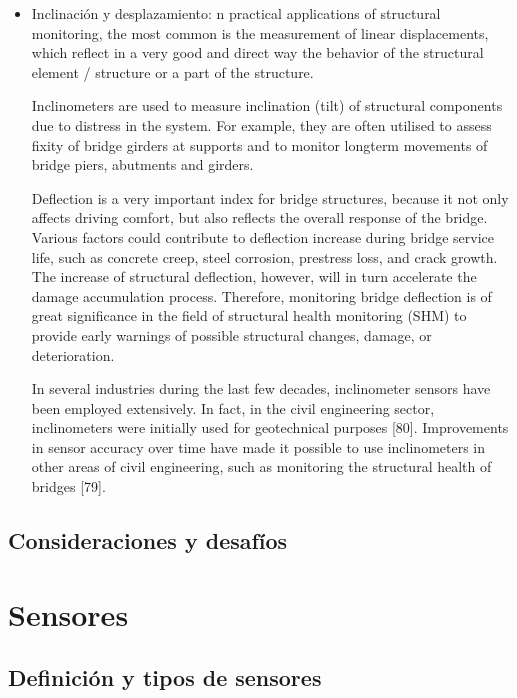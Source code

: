 \begin{itemize}
        \item Inclinación y desplazamiento: n practical applications of structural monitoring, the most common is the measurement of linear displacements, which reflect in a very good and direct way the behavior of the structural element / structure or a part of the structure.
        
        Inclinometers are used to measure inclination (tilt) of structural components due to distress in the system. For example, they are often utilised to assess fixity of bridge girders at supports and to monitor longterm movements of bridge piers, abutments and girders.

        Deflection is a very important index for bridge structures, because it not only affects driving comfort, but also reflects the overall response of the bridge. Various factors could contribute to deflection increase during bridge service life, such as concrete creep, steel corrosion, prestress loss, and crack growth. The increase of structural deflection, however, will in turn accelerate the damage accumulation process. Therefore, monitoring bridge deflection is of great significance in the field of structural health monitoring (SHM) to provide early warnings of possible structural changes, damage, or deterioration.

        In several industries during the last few decades, inclinometer sensors have been employed extensively. In fact, in the civil engineering sector, inclinometers were initially used for geotechnical purposes [80]. Improvements in sensor accuracy over time have made it possible to use inclinometers in other areas of civil engineering, such as monitoring the structural health of bridges [79].
        


    \end{itemize}
    

\subsection{Consideraciones y desafíos}

\section{Sensores}

\subsection{Definición y tipos de sensores}


